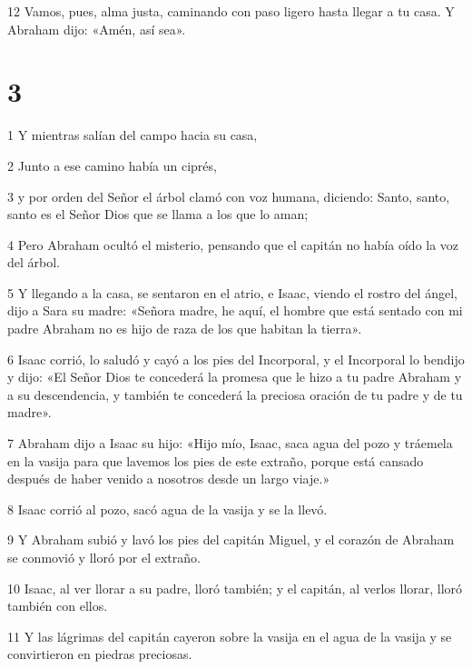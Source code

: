 \par 12 Vamos, pues, alma justa, caminando con paso ligero hasta llegar a tu casa. Y Abraham dijo: «Amén, así sea».


\chapter{3}

\par 1 Y mientras salían del campo hacia su casa,

\par 2 Junto a ese camino había un ciprés,

\par 3 y por orden del Señor el árbol clamó con voz humana, diciendo: Santo, santo, santo es el Señor Dios que se llama a los que lo aman;

\par 4 Pero Abraham ocultó el misterio, pensando que el capitán no había oído la voz del árbol.

\par 5 Y llegando a la casa, se sentaron en el atrio, e Isaac, viendo el rostro del ángel, dijo a Sara su madre: «Señora madre, he aquí, el hombre que está sentado con mi padre Abraham no es hijo de raza de los que habitan la tierra».

\par 6 Isaac corrió, lo saludó y cayó a los pies del Incorporal, y el Incorporal lo bendijo y dijo: «El Señor Dios te concederá la promesa que le hizo a tu padre Abraham y a su descendencia, y también te concederá la preciosa oración de tu padre y de tu madre».

\par 7 Abraham dijo a Isaac su hijo: «Hijo mío, Isaac, saca agua del pozo y tráemela en la vasija para que lavemos los pies de este extraño, porque está cansado después de haber venido a nosotros desde un largo viaje.»

\par 8 Isaac corrió al pozo, sacó agua de la vasija y se la llevó.

\par 9 Y Abraham subió y lavó los pies del capitán Miguel, y el corazón de Abraham se conmovió y lloró por el extraño.

\par 10 Isaac, al ver llorar a su padre, lloró también; y el capitán, al verlos llorar, lloró también con ellos.

\par 11 Y las lágrimas del capitán cayeron sobre la vasija en el agua de la vasija y se convirtieron en piedras preciosas.

